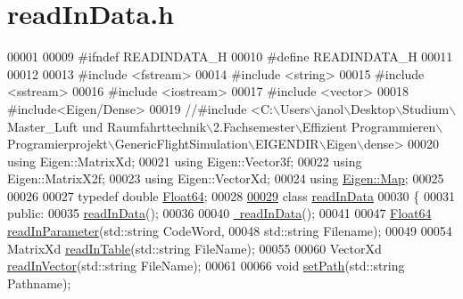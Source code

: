 \hypertarget{read_in_data_8h_source}{}\section{read\+In\+Data.\+h}
\label{read_in_data_8h_source}

\begin{DoxyCode}
00001 
00009 \textcolor{preprocessor}{#ifndef READINDATA\_H}
00010 \textcolor{preprocessor}{#define READINDATA\_H}
00011 
00012 
00013 \textcolor{preprocessor}{#include <fstream>}
00014 \textcolor{preprocessor}{#include <string>}
00015 \textcolor{preprocessor}{#include <sstream>}
00016 \textcolor{preprocessor}{#include <iostream>}
00017 \textcolor{preprocessor}{#include <vector>}
00018 \textcolor{preprocessor}{#include<Eigen/Dense>}
00019 \textcolor{comment}{//#include <C:\(\backslash\)Users\(\backslash\)janol\(\backslash\)Desktop\(\backslash\)Studium\(\backslash\)Master\_Luft und Raumfahrttechnik\(\backslash\)2.Fachsemester\(\backslash\)Effizient
       Programmieren\(\backslash\)Programierprojekt\(\backslash\)GenericFlightSimulation\(\backslash\)EIGENDIR\(\backslash\)Eigen\(\backslash\)dense>}
00020 \textcolor{keyword}{using} Eigen::MatrixXd;
00021 \textcolor{keyword}{using} Eigen::Vector3f;
00022 \textcolor{keyword}{using} Eigen::MatrixX2f;
00023 \textcolor{keyword}{using} Eigen::VectorXd;
00024 \textcolor{keyword}{using} \hyperlink{group___core___module_class_eigen_1_1_map}{Eigen::Map};
00025 
00026 
00027 \textcolor{keyword}{typedef} \textcolor{keywordtype}{double} \hyperlink{group___tools_ga3f1431cb9f76da10f59246d1d743dc2c}{Float64};
00028 
\hyperlink{classread_in_data}{00029} \textcolor{keyword}{class }\hyperlink{classread_in_data}{readInData}
00030 \{
00031 \textcolor{keyword}{public}:
00035     \hyperlink{classread_in_data_adf5f563c9d967b1291c8a26c61b33c27}{readInData}();
00036 
00040     \hyperlink{classread_in_data_af34d37cf1fb596bca7f1f9c1c97fd2eb}{~readInData}();
00041 
00047     \hyperlink{group___tools_ga3f1431cb9f76da10f59246d1d743dc2c}{Float64} \hyperlink{classread_in_data_a9ae979e74958b43424cb6cf4a22043d7}{readInParameter}(std::string CodeWord, 
00048                             std::string Filename);
00049 
00054      MatrixXd \hyperlink{classread_in_data_af616573832efc2c27f07f5f6877b1386}{readInTable}(std::string FileName);
00055 
00060     VectorXd \hyperlink{classread_in_data_ab57aff38529234593d786ecace301cf7}{readInVector}(std::string FileName);
00061 
00066     \textcolor{keywordtype}{void} \hyperlink{classread_in_data_ad67d566fd837f6d721db279144d484e0}{setPath}(std::string Pathname);

\end{DoxyCode}
